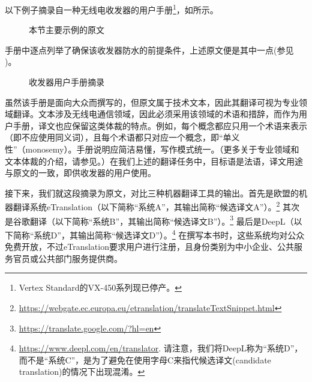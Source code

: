 \documentclass[output=paper]{langscibook}
\begin{document}
以下例子摘录自一种无线电收发器的用户手册\footnote{Vertex Standard的VX-450系列现已停产。}，如所示。

\begin{figure}
\caption{本节主要示例的原文}
\label{fig:rossi:2}
\end{figure}

\begin{sloppypar}
手册中逐点列举了确保该收发器防水的前提条件，上述原文便是其中一点(参见 )。
\end{sloppypar}

\begin{figure}
\caption{收发器用户手册摘录}
\label{fig:rossi:3}
\end{figure}

\largerpage
虽然该手册是面向大众而撰写的，但原文属于技术文本，因此其翻译可视为专业领域翻译。文本涉及无线电通信领域，因此必须采用该领域的术语和措辞，而作为用户手册，译文也应保留这类体裁的特点。例如，每个概念都应只用一个术语来表示（即不应使用同义词），且每个术语都只对应一个概念，即“单义性”（monosemy）。手册说明应简洁易懂，写作模式统一。（更多关于专业领域和文本体裁的介绍，请参见。）在我们上述的翻译任务中，目标语是法语，译文用途与原文的一致，即供收发器的用户使用。

接下来，我们就这段摘录为原文，对比三种机器翻译工具的输出。首先是欧盟的机器翻译系统eTranslation（以下简称“系统A”，其输出简称“候选译文A”）。\footnote{\url{https://webgate.ec.europa.eu/etranslation/translateTextSnippet.html}} 其次是谷歌翻译（以下简称“系统B”，其输出简称“候选译文B”）。\footnote{\url{https://translate.google.com/?hl=en}} 最后是DeepL（以下简称“系统D”，其输出简称“候选译文D”）。\footnote{\url{https://www.deepl.com/en/translator}{. 请注意，我们将DeepL称为“系统D”，而不是“系统C”，是为了避免在使用字母C来指代候选译文(candidate
translation)的情况下出现混淆。}} 在撰写本书时，这些系统均对公众免费开放，不过eTranslation要求用户进行注册，且身份类别为中小企业、公共服务官员或公共部门服务提供商。
\end{document}
